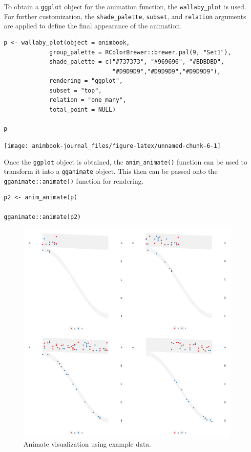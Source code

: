 To obtain a \texttt{ggplot} object for the animation function, the \texttt{wallaby\_plot} is used. For further customization, the \texttt{shade\_palette}, \texttt{subset}, and \texttt{relation} arguments are applied to define the final appearance of the animation.

\begin{verbatim}
p <- wallaby_plot(object = animbook,
             group_palette = RColorBrewer::brewer.pal(9, "Set1"),
             shade_palette = c("#737373", "#969696", "#BDBDBD",
                               "#D9D9D9","#D9D9D9","#D9D9D9"),
             rendering = "ggplot",
             subset = "top",
             relation = "one_many",
             total_point = NULL)

p
\end{verbatim}

\begin{center}\texttt{[image: animbook-journal\_files/figure-latex/unnamed-chunk-6-1]} \end{center}

Once the \texttt{ggplot} object is obtained, the \texttt{anim\_animate()} function can be used to transform it into a \texttt{gganimate} object. This then can be passed onto the \texttt{gganimate::animate()} function for rendering.

\begin{verbatim}
p2 <- anim_animate(p)

gganimate::animate(p2)
\end{verbatim}

\begin{figure}

{\centering \includegraphics[width=1\linewidth]{figures/animation-example} 

}

\caption{Animate visualization using example data.}\label{fig:catchange-figure}
\end{figure}

